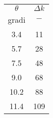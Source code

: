 \begin{table}[H]
    \centering
    \begin{tabular}{|c|c|}
    \hline
        $\theta$	&	$\Delta k$	\\
        gradi	&	$-$	\\
        \hline
        3.4	&	11	\\
        5.7	&	28	\\
        7.5	&	48	\\
        9.0	&	68	\\
        10.2	&	88	\\
        11.4	&	109	\\
    \hline
    \end{tabular}
\end{table}
